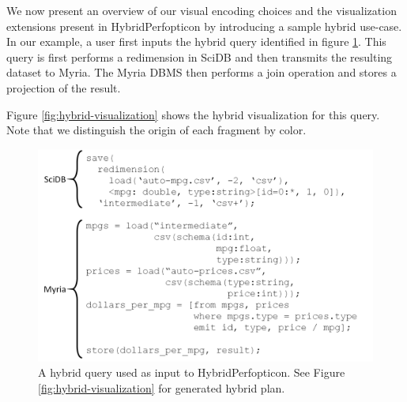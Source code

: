\documentclass{chi2009}
\begin{document}
We now present an overview of our visual encoding choices and the visualization extensions present in HybridPerfopticon by introducing a sample hybrid use-case. In our example, a user first inputs the hybrid query identified in figure \ref{fig:hybrid-plan}. This query is first performs a redimension in SciDB and then transmits the resulting dataset to Myria.  The Myria DBMS then performs a join operation and stores a projection of the result. 

Figure \ref{fig:hybrid-visualization} shows the hybrid visualization for this query. Note that we distinguish the origin of each fragment by color.

\begin{figure}[h]
\begin{center}
\includegraphics[scale=0.17]{visualization-query.png}
\end{center}
\caption{A hybrid query used as input to HybridPerfopticon.  See Figure \ref{fig:hybrid-visualization} for generated hybrid plan.}
\label{fig:hybrid-plan}
\end{figure}
\end{document}
